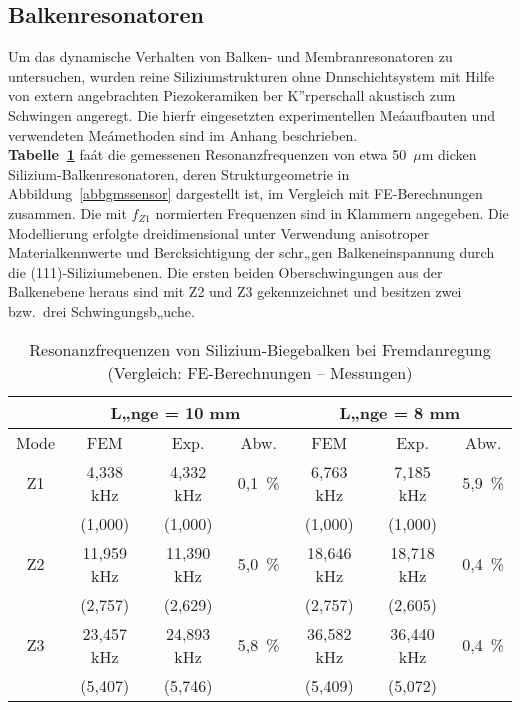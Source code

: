 \subsection{Balkenresonatoren}
\label{balkenresonatoren}

Um das dynamische Verhalten von Balken- und Membranresonatoren
zu untersuchen, wurden reine Siliziumstrukturen ohne Dnnschichtsystem
mit Hilfe von extern angebrachten Piezokeramiken ber K”rperschall
akustisch zum Schwingen angeregt. Die hierfr eingesetzten experimentellen
Meáaufbauten und verwendeten Meámethoden sind im Anhang beschrieben.\\
%
{\bf Tabelle~\ref{tabbalkenfreq}} faát die gemessenen Resonanzfrequenzen
von etwa 50~$\mu$m dicken Silizium-Balkenresonatoren,
deren Strukturgeometrie in Abbildung~\ref{abbgmssensor} dargestellt ist,
im Vergleich mit FE-Berechnungen zusammen. Die mit $f_{Z1}$ normierten
Frequenzen sind in Klammern angegeben. Die Modellierung erfolgte
dreidimensional unter Verwendung anisotroper Materialkennwerte \cite{LB82}
und Bercksichtigung der schr„gen Balkeneinspannung durch die
(111)-Siliziumebenen. Die ersten beiden Oberschwingungen aus der
Balkenebene heraus sind mit Z2 und Z3 gekennzeichnet und besitzen zwei
bzw.\ drei Schwingungsb„uche.
\begin{table}[htb]
\caption{\label{tabbalkenfreq}
 Resonanzfrequenzen von Silizium-Biegebalken bei Fremdanregung
 (Vergleich: FE-Berechnungen -- Messungen)}
\begin{center}
\begin{tabular} {|c||c|c|c||c|c|c|}
\cline{1-7}
   & \multicolumn{3}{c||}{L„nge = 10 mm} & \multicolumn{3}{c|}{L„nge = 8 mm} \\
\hline
Mode  & FEM  & Exp. & Abw. & FEM & Exp. & Abw. \\
\hline \hline
Z1 & 4,338 kHz  &  4,332 kHz & 0,1~\% &  6,763 kHz & 7,185 kHz  & 5,9~\% \\
   & (1,000)    &  (1,000)   &       &  (1,000)   & (1,000)    & \\
\hline
Z2 & 11,959 kHz & 11,390 kHz & 5,0~\% & 18,646 kHz & 18,718 kHz & 0,4~\% \\
   & (2,757)    &  (2,629)   &       &  (2,757)   & (2,605)    & \\
\hline
Z3 & 23,457 kHz & 24,893 kHz & 5,8~\% & 36,582 kHz & 36,440 kHz & 0,4~\% \\
   & (5,407)    &  (5,746)   &       &  (5,409)   & (5,072)    & \\
\hline
\end{tabular}\\
\end{center}
\end{table}
